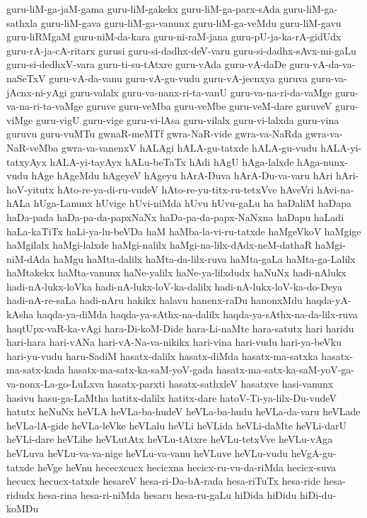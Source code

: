 {guru-liM-ga-jaM-gama
guru-liM-gakekx
guru-liM-ga-parx-sAda
guru-liM-ga-sathxla
guru-liM-gava
guru-liM-ga-vanunx
guru-liM-ga-veMdu
guru-liM-gavu
guru-liRMgaM
guru-niM-da-kara
guru-ni-raM-jana
guru-pU-ja-ka-rA-gidUdx
guru-rA-ja-cA-ritarx
gurusi
guru-si-dadhx-deV-varu
guru-si-dadhx-sAvx-mi-gaLu
guru-si-dedhxV-vara
guru-ti-su-tAtxre
guru-vAda
guru-vA-daDe
guru-vA-da-va-naSeTxV
guru-vA-da-vanu
guru-vA-gu-vudu
guru-vA-jecnxya
guruva
guru-va-jAcnx-ni-yAgi
guru-valalx
guru-va-nanx-ri-ta-vanU
guru-va-na-ri-da-vaMge
guru-va-na-ri-ta-vaMge
guruve
guru-veMba
guru-veMbe
guru-veM-dare
guruveV
guru-viMge
guru-vigU
guru-vige
guru-vi-lAsa
guru-vilalx
guru-vi-lalxda
guru-vina
guruvu
guru-vuMTu
gwnaR-meMTf
gwra-NaR-vide
gwra-va-NaRda
gwra-va-NaR-veMba
gwra-va-vanenxV
hALAgi
hALA-gu-tatxde
hALA-gu-vudu
hALA-yi-tatxyAyx
hALA-yi-tayAyx
hALu-beTaTx
hAdi
hAgU
hAga-lalxde
hAga-nunx-vudu
hAge
hAgeMdu
hAgeyeV
hAgeyu
hArA-Duva
hArA-Du-va-varu
hAri
hAri-hoV-yitutx
hAto-re-ya-di-ru-vudeV
hAto-re-yu-titx-ru-tetxVve
hAveVri
hAvi-na-hALa
hUga-Lanunx
hUvige
hUvi-niMda
hUvu
hUvu-gaLu
ha
haDaliM
haDapa
haDa-pada
haDa-pa-da-papxNaNx
haDa-pa-da-papx-NaNxna
haDapu
haLadi
haLa-kaTiTx
haLi-ya-lu-beVDa
haM
haMba-la-vi-ru-tatxde
haMgeVkoV
haMgige
haMgilalx
haMgi-lalxde
haMgi-nalilx
haMgi-na-lilx-dAdx-neM-dathaR
haMgi-niM-dAda
haMgu
haMta-dalilx
haMta-da-lilx-ruva
haMta-gaLa
haMta-ga-Lalilx
haMtakekx
haMta-vanunx
haNe-yalilx
haNe-ya-lilxdudx
haNuNx
hadi-nAlukx
hadi-nA-lukx-loVka
hadi-nA-lukx-loV-ka-dalilx
hadi-nA-lukx-loV-ka-do-Deya
hadi-nA-re-saLa
hadi-nAru
hakikx
halavu
hanenx-raDu
hanonxMdu
haqda-yA-kAsha
haqda-ya-diMda
haqda-ya-sAthx-na-dalilx
haqda-ya-sAthx-na-da-lilx-ruva
haqtUpx-vaR-ka-vAgi
hara-Di-koM-Dide
hara-Li-naMte
hara-satutx
hari
haridu
hari-hara
hari-vANa
hari-vA-Na-va-nikikx
hari-vina
hari-vudu
hari-ya-beVku
hari-yu-vudu
haru-SadiM
hasatx-dalilx
hasatx-diMda
hasatx-ma-satxka
hasatx-ma-satx-kada
hasatx-ma-satx-ka-saM-yoV-gada
hasatx-ma-satx-ka-saM-yoV-ga-va-nonx-La-go-LuLxva
hasatx-parxti
hasatx-sathxleV
hasatxve
hasi-vanunx
hasivu
hasu-ga-LaMtha
hatitx-dalilx
hatitx-dare
hatoV-Ti-ya-lilx-Du-vudeV
hatutx
heNuNx
heVLA
heVLa-ba-hudeV
heVLa-ba-hudu
heVLa-da-varu
heVLade
heVLa-lA-gide
heVLa-leVke
heVLalu
heVLi
heVLida
heVLi-daMte
heVLi-darU
heVLi-dare
heVLihe
heVLutAtx
heVLu-tAtxre
heVLu-tetxVve
heVLu-vAga
heVLuva
heVLu-va-va-nige
heVLu-va-vanu
heVLuve
heVLu-vudu
heVgA-gu-tatxde
heVge
heVnu
hececxcucx
hecicxna
hecicx-ru-vu-da-riMda
hecicx-suva
hecucx
hecucx-tatxde
hesareV
hesa-ri-Da-bA-rada
hesa-riTuTx
hesa-ride
hesa-ridudx
hesa-rina
hesa-ri-niMda
hesaru
hesa-ru-gaLu
hiDida
hiDidu
hiDi-du-koMDu
}
